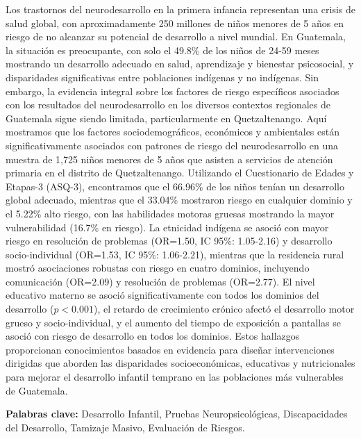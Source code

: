 \documentclass[11pt,letterpaper]{report}
\begin{document}
Los trastornos del neurodesarrollo en la primera infancia representan una 
crisis de salud global, con aproximadamente 250 millones de niños menores de 5 
años en riesgo de no alcanzar su potencial de desarrollo a nivel mundial. En 
Guatemala, la situación es preocupante, con solo el 49.8\% de los 
niños de 24-59 meses mostrando un desarrollo adecuado en salud, aprendizaje y 
bienestar psicosocial, y disparidades significativas entre poblaciones 
indígenas y no indígenas. Sin embargo, la evidencia integral sobre los factores 
de riesgo específicos asociados con los resultados del neurodesarrollo en los 
diversos contextos regionales de Guatemala sigue siendo limitada, 
particularmente en Quetzaltenango. Aquí mostramos que los 
factores sociodemográficos, económicos y ambientales están significativamente 
asociados con patrones de riesgo del neurodesarrollo en una muestra de 1,725 
niños menores de 5 años que asisten a servicios de atención primaria en el 
distrito de Quetzaltenango. Utilizando el Cuestionario de Edades y Etapas-3 
(ASQ-3), encontramos que el 66.96\% de los niños tenían un desarrollo global 
adecuado, mientras que el 33.04\% mostraron riesgo en cualquier dominio y el 
5.22\% alto riesgo, con las habilidades motoras gruesas mostrando la mayor 
vulnerabilidad (16.7\% en riesgo). La etnicidad indígena se asoció con mayor 
riesgo en resolución de problemas (OR=1.50, IC 95\%: 1.05-2.16) y desarrollo 
socio-individual (OR=1.53, IC 95\%: 1.06-2.21), mientras que la residencia 
rural mostró asociaciones robustas con riesgo en cuatro dominios, incluyendo 
comunicación (OR=2.09) y resolución de problemas (OR=2.77). El nivel educativo 
materno se asoció significativamente con todos los dominios del desarrollo 
($p<0.001$), el retardo de crecimiento crónico afectó el desarrollo motor 
grueso y socio-individual, y el aumento del tiempo de exposición a pantallas 
se asoció con riesgo de desarrollo en todos los dominios. Estos hallazgos 
proporcionan conocimientos basados en evidencia para diseñar intervenciones 
dirigidas que aborden las disparidades socioeconómicas, educativas y
nutricionales  para mejorar el desarrollo infantil temprano en las poblaciones
más  vulnerables de Guatemala.

\textbf{Palabras clave:} Desarrollo Infantil, Pruebas Neuropsicológicas, 
Discapacidades del Desarrollo, Tamizaje Masivo, Evaluación de Riesgos.

\tableofcontents

\clearpage
{}
\setcounter{page}{1}
\end{document}
